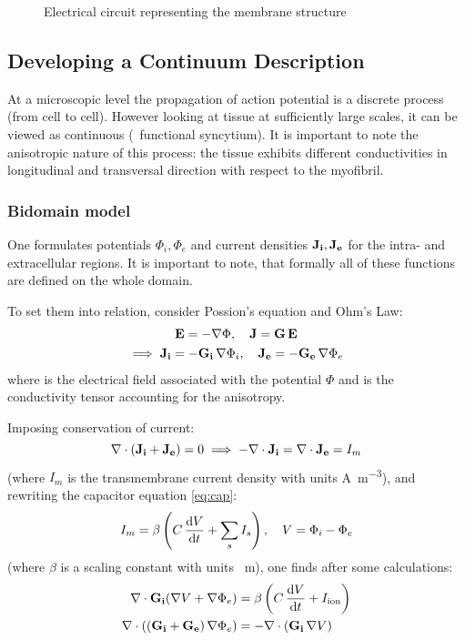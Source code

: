\begin{figure}[h!]
    \centering
    
    \caption{Electrical circuit representing the membrane structure}
    \label{fig:circut}
\end{figure}


\subsection{Developing a Continuum Description}
\label{sec:contdescr}
At a microscopic level the propagation of action potential is a discrete
process (from cell to cell). However looking at tissue at sufficiently
large scales, it can be viewed as continuous (\textrightarrow~functional
syncytium). It is important to note the anisotropic nature of this process:
the tissue exhibits different conductivities in longitudinal and transversal
direction with respect to the myofibril.

\subsubsection{Bidomain model}
One formulates potentials $\Phi_i, \Phi_e$ and current densities $\mathbf{J_i},
\mathbf{J_e}$ for the intra- and extracellular regions.  It is important to
note, that formally all of these functions are defined on the whole domain.

To set them into relation, consider Possion's equation and Ohm's Law:
\begin{gather*}
    \mathbf{E}=-\nabla\Phi,\quad \mathbf{J}=\mathbf{G}\,\mathbf{E} \\
    \implies \mathbf{J_i}=-\mathbf{G_i}\,\nabla\Phi_i,\quad
    \mathbf{J_e}=-\mathbf{G_e}\,\nabla\Phi_e
\end{gather*}
where  is the electrical field associated with the potential $\Phi$
and  is the conductivity tensor accounting for the anisotropy.

Imposing conservation of current:
\begin{equation*}
    \nabla\cdot(\mathbf{J_i}+\mathbf{J_e})=0 \implies
    -\nabla\cdot\mathbf{J_i}=\nabla\cdot\mathbf{J_e}=I_m
\end{equation*}
(where $I_m$ is the transmembrane current density with units
\si{\ampere\per\metre\cubed}), and rewriting the capacitor equation
\eqref{eq:cap}:
\begin{equation*}
    I_m=\beta\left(C\,\dv{V}{t}+\sum_{s}I_{s}\right),\quad V=\Phi_i-\Phi_e
\end{equation*}
(where $\beta$ is a scaling constant with units \si{\per\metre}), one finds
after some calculations:
\begin{subequations}
\begin{align}
    \nabla\cdot\mathbf{G_i}(\nabla{V}+\nabla\Phi_e)
    &=\beta\left(C\,\dv{V}{t}+I_{\mathrm{ion}}\right)
    \label{eq:i}
    \\
    \nabla\cdot\left((\mathbf{G_i}+\mathbf{G_e})\,\nabla\Phi_e\right)
    &=-\nabla\cdot(\mathbf{G_i}\,\nabla{V})
    \label{eq:ii}
\end{align}
\end{subequations}

